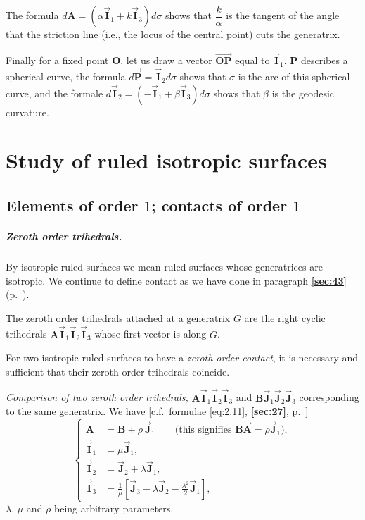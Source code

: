 \documentclass[leqno,11pt]{book}
\numberwithin{equation}{chapter}
\theoremstyle{shape1}
\theoremstyle{shapesmall}
\newcommand{\fsref}[1]{{\rm\textsection\textbf{\ref{sec:#1}}}}
\newcommand{\rvec}[1]{\vec{\mathbf{#1}}}
\newcommand{\ivec}{\rvec{I}}
\newcommand{\jvec}{\rvec{J}}
\newcommand{\somespace}{\vspace{9pt}}
\begin{document}
The formula $d\mathbf{A}=(\alpha\ivec_{1}+k\ivec_{3})d\sigma$ shows that $\dfrac{k}{\alpha}$ is the tangent of the angle that the striction line (i.e., the locus of the central point) cuts the generatrix.

Finally for a fixed point $\mathbf{O}$, let us draw a vector $\overrightarrow{\mathbf{OP}}$ equal to $\ivec_{1}$. $\mathbf{P}$ describes a spherical curve, the formula $\overrightarrow{d\mathbf{P}}=\ivec_{2}d\sigma$ shows that $\sigma$ is the arc of this spherical curve, and the formale $d\ivec_{2}=(-\ivec_{1}+\beta\ivec_{3})d\sigma$ shows that $\beta$ is the geodesic curvature.


\chapter{Study of ruled isotropic surfaces}
\label{cha:study-ruled-isotr}

\section{Elements of order $1$; contacts of order $1$}
\label{sec:elements-order-1}

\paragraph{Zeroth order trihedrals.}
\label{sec:49}
By isotropic ruled surfaces we mean ruled surfaces whose generatrices are isotropic. We continue to define contact as we have done in paragraph \fsref{43} (p.~\pageref{sec:43}).

The zeroth order trihedrals attached at a generatrix $G$ are the right cyclic trihedrals $\mathbf{A}\ivec_{1}\ivec_{2}\ivec_{3}$ whose first vector is along $G$.

For two isotropic ruled surfaces to have a \emph{zeroth order contact}, it is necessary and sufficient that their zeroth order trihedrals coincide.

\somespace

\emph{Comparison of two zeroth order trihedrals,} $\mathbf{A}\ivec_{1}\ivec_{2}\ivec_{3}$ and $\mathbf{B}\jvec_{1}\jvec_{2}\jvec_{3}$ corresponding to the same generatrix. We have [c.f.~formulae \eqref{eq:2.11}, \fsref{27}, p.~\pageref{sec:27}]
\begin{equation}
  \label{eq:4.1}
  \left\{
    \begin{aligned}
      \mathbf{A}&=\mathbf{B}+\rho\,\jvec_{1}\qquad\text{(this signifies $\overrightarrow{\mathbf{BA}}=\rho\jvec_{1}$)},\\
      \ivec_{1}&=\mu\jvec_{1},\\
      \ivec_{2}&=\jvec_{2}+\lambda\jvec_{1},\\
      \ivec_{3}&=\frac{1}{\mu}\left[\jvec_{3}-\lambda\jvec_{2}-\frac{\lambda^{2}}{2}\jvec_{1}\right],
    \end{aligned}
  \right.
\end{equation}
$\lambda$, $\mu$ and $\rho$ being arbitrary parameters.
\end{document}
